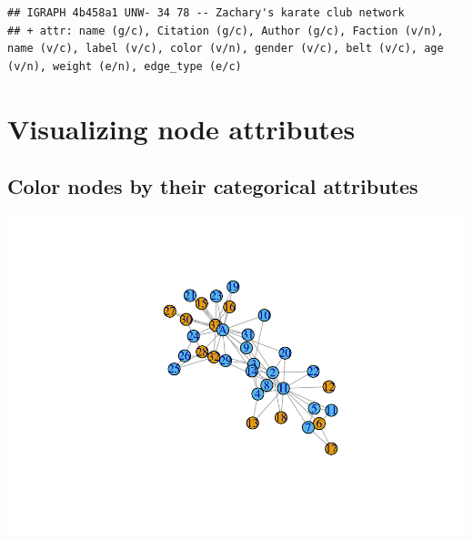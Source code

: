 \documentclass[
]{book}
\newenvironment{Shaded}{\begin{snugshade}}{\end{snugshade}}
\newcommand{\AttributeTok}[1]{\textcolor[rgb]{0.13,0.29,0.53}{#1}}
\newcommand{\CommentTok}[1]{\textcolor[rgb]{0.56,0.35,0.01}{\textit{#1}}}
\newcommand{\FunctionTok}[1]{\textcolor[rgb]{0.13,0.29,0.53}{\textbf{#1}}}
\newcommand{\NormalTok}[1]{#1}
\newcommand{\SpecialCharTok}[1]{\textcolor[rgb]{0.81,0.36,0.00}{\textbf{#1}}}
\begin{document}
\begin{verbatim}
## IGRAPH 4b458a1 UNW- 34 78 -- Zachary's karate club network
## + attr: name (g/c), Citation (g/c), Author (g/c), Faction (v/n), name (v/c), label (v/c), color (v/n), gender (v/c), belt (v/c), age (v/n), weight (e/n), edge_type (e/c)
\end{verbatim}

\section{Visualizing node attributes}\label{visualizing-node-attributes}

\subsection{Color nodes by their categorical attributes}\label{color-nodes-by-their-categorical-attributes}

\begin{Shaded}
\end{Shaded}

\includegraphics{bookdown-demo_files/figure-latex/unnamed-chunk-177-1.pdf}

\begin{Shaded}
\end{Shaded}
\end{document}
